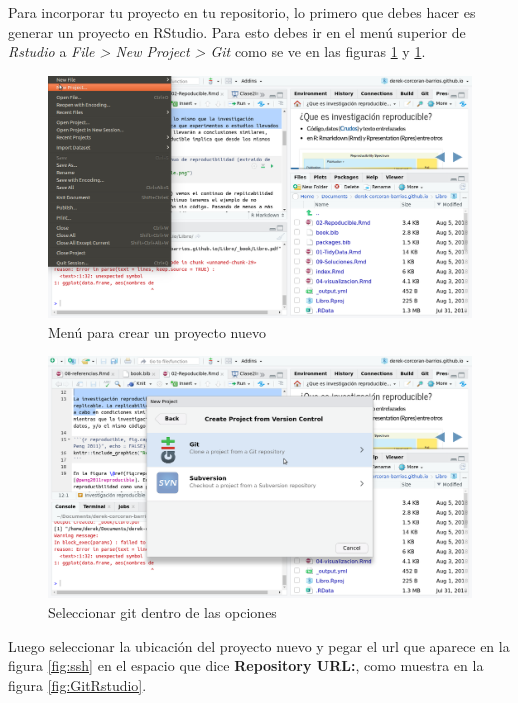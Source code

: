 \documentclass[]{book}
\begin{document}
Para incorporar tu proyecto en tu repositorio, lo primero que debes
hacer es generar un proyecto en RStudio. Para esto debes ir en el menú
superior de \emph{Rstudio} a \emph{File \textgreater{} New Project
\textgreater{} Git} como se ve en las figuras \ref{fig:NewProject} y
\ref{fig:NewProject}.

\begin{figure}

{\centering \includegraphics[width=0.8\linewidth]{NewProject} 

}

\caption{Menú para crear un proyecto nuevo}\label{fig:NewProject}
\end{figure}

\begin{figure}

{\centering \includegraphics[width=0.8\linewidth]{Git} 

}

\caption{Seleccionar git dentro de las opciones}\label{fig:Git}
\end{figure}

Luego seleccionar la ubicación del proyecto nuevo y pegar el url que
aparece en la figura \ref{fig:ssh} en el espacio que dice
\textbf{Repository URL:}, como muestra en la figura
\ref{fig:GitRstudio}.
\end{document}
